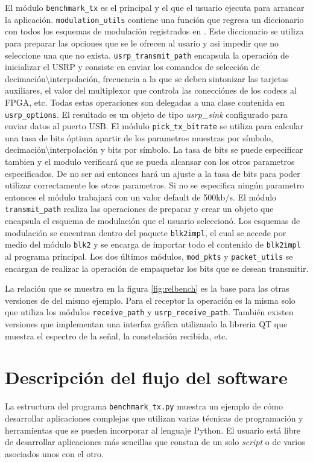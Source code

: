 El m\'odulo \verb|benchmark_tx| es el principal y el que el usuario ejecuta para arrancar la
aplicaci\'on. \verb|modulation_utils| contiene una funci\'on que regresa un diccionario con todos los
esquemas de modulaci\'on registrados en \gnuradio. Este diccionario se utiliza para preparar las
opciones que se le ofrecen al usario y asi impedir que no seleccione una que no exista.
\verb|usrp_transmit_path| encapsula la operaci\'on de inicializar el USRP y consiste en enviar los
comandos de selecci\'on de decimaci\'on\textbackslash interpolaci\'on, frecuencia a la que se deben
sintonizar las tarjetas auxiliares, el valor del multiplexor que controla las conecci\'ones de los codecs al FPGA,
etc. Todas estas operaciones son delegadas a una clase contenida en \verb|usrp_options|. El
resultado es un objeto de tipo \emph{usrp\_sink} configurado para enviar datos al puerto USB. El
m\'odulo \verb|pick_tx_bitrate| se utiliza para calcular una tasa de bits \'optima apartir de los
parametros muestras por s\'imbolo, decimaci\'on\textbackslash interpolaci\'on y bits por s\'imbolo.
La tasa de bits se puede especificar tambien y el modulo verificar\'a que se pueda alcansar con los otros
parametros especificados. De no ser asi entonces har\'a un ajuste a la tasa de bits para poder
utilizar correctamente los otros parametros. Si no se especifica ning\'un parametro entonces el
m\'odulo trabajar\'a con un valor default de 500kb/s.
El m\'odulo \verb|transmit_path| realiza las operaciones de preparar y crear un objeto que encapsula
el esquema de modulaci\'on que el usuario seleccion\'o. Los esquemas de modulaci\'on se encentran
dentro del paquete \verb|blk2impl|, el cual se accede por medio del m\'odulo \verb|blk2| y se
encarga de importar todo el contenido de \verb|blk2impl| al programa principal. Los dos \'ultimos
m\'odulos, \verb|mod_pkts| y \verb|packet_utils| se encargan de realizar la operaci\'on de
empaquetar los bits que se desean transmitir.

La relaci\'on que se muestra en la figura \ref{fig:relbench} es la base para las otras versiones de
del mismo ejemplo. Para el receptor la operaci\'on es la misma solo que utiliza los m\'odulos
\verb|receive_path| y \verb|usrp_receive_path|. Tambi\'en existen versiones que implementan una
interfaz gr\'afica utilizando la libreria QT que muestra el espectro de la se\~nal, la constelaci\'on
recibida, etc.

\section{Descripci\'on del flujo del software}
La estructura del programa \verb|benchmark_tx.py| muestra un ejemplo de c\'omo desarrollar
aplicaciones complejas que utilizan varias t\'ecnicas de programaci\'on y herramientas que se pueden
incorporar al lenguaje Python. El usuario est\'a libre de desarrollar aplicaciones m\'as sencillas
que constan de un solo \emph{script} o de varios asociados unos con el otro. 

